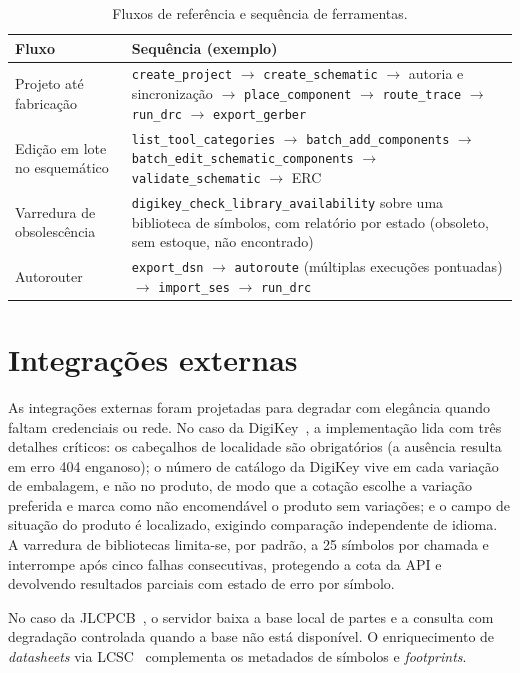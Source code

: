 \begin{table}[htbp]
\centering
\small
\caption{Fluxos de referência e sequência de ferramentas.}
\label{tab:fluxos}
\begin{tabular}{@{}p{3.2cm}p{11.2cm}@{}}
\toprule
\textbf{Fluxo} & \textbf{Sequência (exemplo)} \\
\midrule
Projeto até fabricação & \texttt{create\_project} $\rightarrow$ \texttt{create\_schematic} $\rightarrow$ autoria e sincronização $\rightarrow$ \texttt{place\_component} $\rightarrow$ \texttt{route\_trace} $\rightarrow$ \texttt{run\_drc} $\rightarrow$ \texttt{export\_gerber} \\
Edição em lote no esquemático & \texttt{list\_tool\_categories} $\rightarrow$ \texttt{batch\_add\_components} $\rightarrow$ \texttt{batch\_edit\_schematic\_components} $\rightarrow$ \texttt{validate\_schematic} $\rightarrow$ ERC \\
Varredura de obsolescência & \texttt{digikey\_check\_library\_availability} sobre uma biblioteca de símbolos, com relatório por estado (obsoleto, sem estoque, não encontrado) \\
Autorouter & \texttt{export\_dsn} $\rightarrow$ \texttt{autoroute} (múltiplas execuções pontuadas) $\rightarrow$ \texttt{import\_ses} $\rightarrow$ \texttt{run\_drc} \\
\bottomrule
\end{tabular}
\end{table}

\section{Integrações externas}

As integrações externas foram projetadas para degradar com elegância quando
faltam credenciais ou rede. No caso da DigiKey~\cite{digikey}, a implementação
lida com três
detalhes críticos: os cabeçalhos de localidade são obrigatórios (a ausência
resulta em erro 404 enganoso); o número de catálogo da DigiKey vive em cada
variação de embalagem, e não no produto, de modo que a cotação escolhe a
variação preferida e marca como não encomendável o produto sem variações; e o
campo de situação do produto é localizado, exigindo comparação independente
de idioma. A varredura de bibliotecas limita-se, por padrão, a 25 símbolos por
chamada e interrompe após cinco falhas consecutivas, protegendo a cota da API
e devolvendo resultados parciais com estado de erro por símbolo.

No caso da JLCPCB~\cite{jlcpcb}, o servidor baixa a base local de partes e a
consulta com degradação controlada quando a base não está disponível. O
enriquecimento de \emph{datasheets} via LCSC~\cite{lcsc} complementa os
metadados de símbolos e \emph{footprints}.

